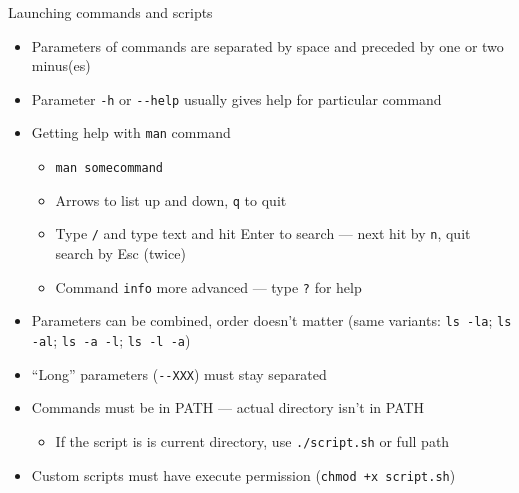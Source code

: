 \documentclass[hyperref={bookmarks=true, unicode=true, colorlinks=true, pdftitle={Linux, command line and MetaCentrum}, plainpages=false, pdfauthor={Vojtech Zeisek}, pdfsubject={Course about use of Linux command line, writing shell scripts and using MetaCentrum of CESNET}, pdfcreator={XeLaTeX, http://www.xelatex.org/}, pdfkeywords={Linux, GNU, BASH, shell, command line, MetaCentrum}, linkcolor=Sienna, anchorcolor=black, citecolor=green, filecolor=magenta, menucolor=Sienna, urlcolor=cyan, pdftex}, compress, ucs, xelatex, xcolor=svgnames, 11pt]{beamer}
\begin{document}
\begin{frame}{Launching commands and scripts}
\begin{itemize}
  \item Parameters of commands are separated by space and preceded by one or two minus(es)
  \item Parameter \texttt{-h} or \texttt{{-}-help} usually gives help for particular command
  \item Getting help with \texttt{man} command
  \begin{itemize}
    \item \texttt{man somecommand}
    \item Arrows to list up and down, \texttt{q} to quit
    \item Type \texttt{/} and type text and hit Enter to search --- next hit by \texttt{n}, quit search by Esc (twice)
    \item Command \texttt{info} more advanced --- type \texttt{?} for help
  \end{itemize}
  \item Parameters can be combined, order doesn't matter (same variants: \texttt{ls -la}; \texttt{ls -al}; \texttt{ls -a -l}; \texttt{ls -l -a})
  \item ``Long'' parameters (\texttt{{-}-XXX}) must stay separated
  \item Commands must be in PATH --- actual directory isn't in PATH
  \begin{itemize}
    \item If the script is is current directory, use \texttt{./script.sh} or full path
  \end{itemize}
  \item Custom scripts must have execute permission (\texttt{chmod +x script.sh})
\end{itemize}
\end{frame}
\end{document}
